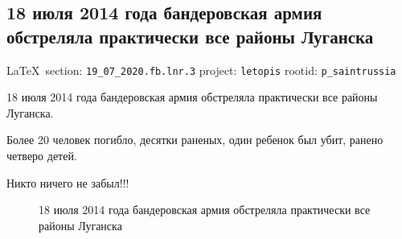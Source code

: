  
 

\subsection{18 июля 2014 года бандеровская армия обстреляла практически все районы Луганска}
\label{sec:19_07_2020.fb.lnr.3}
  
\vspace{0.5cm}
{\small\LaTeX~section: \verb|19_07_2020.fb.lnr.3| project: \verb|letopis| rootid: \verb|p_saintrussia|}
\vspace{0.5cm}
  
18 июля 2014 года бандеровская армия обстреляла практически все районы
Луганска.

Более 20 человек погибло, десятки раненых, один ребенок был убит, ранено
четверо детей.

Никто ничего не забыл!!!

\begin{figure}[ht]
 \centering
 \caption{18 июля 2014 года бандеровская армия обстреляла практически все районы Луганска}
\end{figure}
